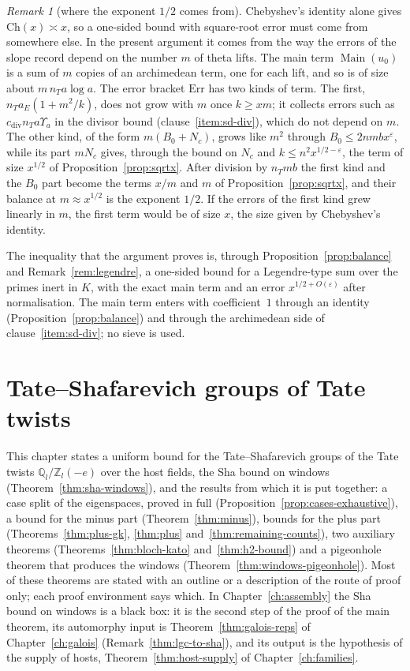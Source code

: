 \documentclass[11pt]{amsbook}
\theoremstyle{plain}
\theoremstyle{definition}
\theoremstyle{remark}
\newtheorem{remark}[theorem]{Remark}
\numberwithin{equation}{section}
\numberwithin{figure}{chapter}
\numberwithin{table}{chapter}
\newcommand{\Q}{\mathbb{Q}}
\newcommand{\Z}{\mathbb{Z}}
\newcommand{\eps}{\varepsilon}
\newcommand{\Ch}{\mathrm{Ch}}
\newcommand{\Err}{\mathrm{Err}}
\newcommand{\Main}{\operatorname{Main}}
\begin{document}
\begin{remark}[where the exponent $1/2$ comes from]
\label{rem:exponent-half}
Chebyshev's identity alone gives $\Ch(x)\asymp x$, so a one-sided bound
with square-root error must come from somewhere else. In the present
argument it comes from the way the errors of the slope record depend
on the number $m$ of theta lifts. The main term $\Main(u_0)$ is a sum
of $m$ copies of an archimedean term, one for each lift, and so is of
size about $m\,n_Ta\log a$. The error bracket $\Err$ has two kinds of
term. The first, $n_Ta_E(1+m^2/k)$, does not grow with $m$ once
$k\ge xm$; it collects errors such as $c_{\mathrm{div}}n_Ta\Upsilon_a$
in the divisor bound (clause~\ref{item:sd-div}), which do not depend on $m$. The
other kind, of the form $m(B_0+N_c)$, grows like $m^2$ through
$B_0\le2nmbx^\eps$, while its part $mN_c$ gives, through the bound on
$N_c$ and $k\le n^2x^{1/2-\eps}$, the term of size $x^{1/2}$ of
Proposition~\ref{prop:sqrtx}. After division by $n_Tmb$ the first kind
and the $B_0$ part become the terms $x/m$ and $m$ of
Proposition~\ref{prop:sqrtx}, and their balance at $m\approx x^{1/2}$
is the exponent $1/2$. If the errors of the first kind grew linearly
in $m$, the first term would be of size $x$, the size given by
Chebyshev's identity.

The inequality that the argument proves is, through
Proposition~\ref{prop:balance} and Remark~\ref{rem:legendre}, a
one-sided bound for a Legendre-type sum over the primes inert in $K$,
with the exact main term and an error $x^{1/2+O(\eps)}$ after
normalisation. The main term enters with coefficient~$1$ through an
identity (Proposition~\ref{prop:balance}) and through the archimedean
side of clause~\ref{item:sd-div}; no sieve is used.
\end{remark}

\FloatBarrier
\clearpage
\clearpage
\chapter{Tate--Shafarevich groups of Tate twists}
\label{ch:sha}\label{sec:sha}

This chapter states a uniform bound for the Tate--Shafarevich groups
of the Tate twists $\Q_l/\Z_l(-e)$ over the host fields, the Sha bound
on windows (Theorem~\ref{thm:sha-windows}), and the results from which
it is put together: a case split of the eigenspaces, proved in full
(Proposition~\ref{prop:cases-exhaustive}), a bound for the minus part
(Theorem~\ref{thm:minus}), bounds for the plus part
(Theorems~\ref{thm:plus-gk}, \ref{thm:plus}
and~\ref{thm:remaining-counts}), two auxiliary theorems
(Theorems~\ref{thm:bloch-kato} and~\ref{thm:h2-bound}) and a
pigeonhole theorem that produces the windows
(Theorem~\ref{thm:windows-pigeonhole}). Most of these theorems are
stated with an outline or a description of the route of proof only;
each proof environment says which. In Chapter~\ref{ch:assembly} the
Sha bound on windows is a black box: it is the second step of the
proof of the main theorem, its automorphy input is
Theorem~\ref{thm:galois-reps} of Chapter~\ref{ch:galois}
(Remark~\ref{thm:lgc-to-sha}), and its output is the hypothesis of the
supply of hosts, Theorem~\ref{thm:host-supply} of
Chapter~\ref{ch:families}.
\end{document}
